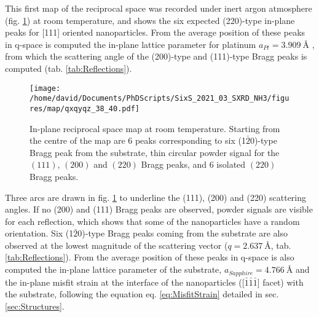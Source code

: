 This first map of the reciprocal space was recorded under inert argon atmosphere (fig. \ref{fig:QxQyMap}) at room temperature, and shows the six expected (220)-type in-plane peaks for [111] oriented nanoparticles.
From the average position of these peaks in q-space is computed the in-plane lattice parameter for platinum $a_{Pt}=\qty{3.909}{\angstrom}$
, from which the scattering angle of the (200)-type and (111)-type Bragg peaks is computed (tab. \ref{tab:Reflections}).

\begin{figure}[!htb]
    \centering
    \texttt{[image: /home/david/Documents/PhDScripts/SixS\_2021\_03\_SXRD\_NH3/figures/map/qxqyqz\_38\_40.pdf]}
    \caption{
        In-plane reciprocal space map at room temperature.
        Starting from the centre of the map are 6 peaks corresponding to six (1$\bar{2}$0)-type Bragg peak from the substrate, thin circular powder signal for the $(111)$, $(200)$ and $(220)$ Bragg peaks, and 6 isolated $(220)$ Bragg peaks.
    }
    \label{fig:QxQyMap}
\end{figure}

Three arcs are drawn in fig. \ref{fig:QxQyMap} to underline the (111), (200) and (220) scattering angles.
If no (200) and (111) Bragg peaks are observed, powder signals are visible for each reflection, which shows that some of the nanoparticles have a random orientation.
Six (1$\bar{2}$0)-type Bragg peaks coming from the  substrate are also observed at the lowest magnitude of the scattering vector ($q = \qty{2.637}{\angstrom}$, tab. \ref{tab:Reflections}).
From the average position of these peaks in q-space is also computed the in-plane lattice parameter of the substrate, $a_{Sapphire}=\qty{4.766}{\angstrom}$ and the in-plane misfit strain at the interface of the nanoparticles ([$\bar{1}\bar{1}\bar{1}$] facet) with the substrate, following the equation eq. \ref{eq:MisfitStrain} detailed in sec. \ref{sec:Structures}.

